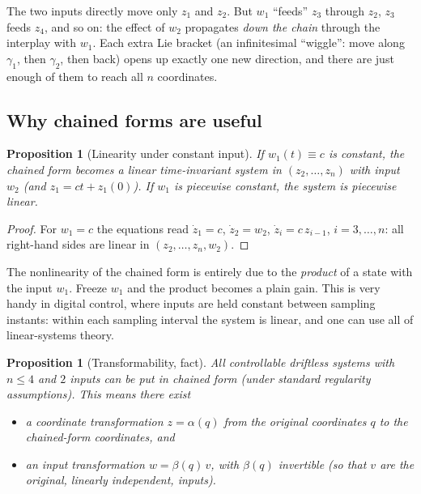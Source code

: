 \documentclass[11pt,a4paper]{article}
\def\bm#1{#1}%
\newcommand{\qv}{\bm{q}}
\newcommand{\zv}{\bm{z}}
\newcommand{\wv}{\bm{w}}
\newcommand{\vv}{\bm{v}}
\theoremstyle{definition}
\theoremstyle{plain}
\newtheorem{proposition}[definition]{Proposition}
\theoremstyle{remark}
\begin{document}
\begin{intuition}
The two inputs directly move only $z_1$ and $z_2$. But $w_1$ ``feeds'' $z_3$ through $z_2$, $z_3$ feeds $z_4$, and so on: the effect of $w_2$ propagates \emph{down the chain} through the interplay with $w_1$. Each extra Lie bracket (an infinitesimal ``wiggle'': move along $\bm\gamma_1$, then $\bm\gamma_2$, then back) opens up exactly one new direction, and there are just enough of them to reach all $n$ coordinates.
\end{intuition}

\subsection{Why chained forms are useful}

\begin{proposition}[Linearity under constant input]\label{prop:linear}
If $w_1(t)\equiv c$ is constant, the chained form becomes a \emph{linear} time-invariant system in $(z_2,\dots,z_n)$ with input $w_2$ (and $z_1=ct+z_1(0)$). If $w_1$ is piecewise constant, the system is piecewise linear.
\end{proposition}
\begin{proof}
For $w_1=c$ the equations read $\dot z_1=c$, $\dot z_2=w_2$, $\dot z_i=c\,z_{i-1}$, $i=3,\dots,n$: all right-hand sides are linear in $(z_2,\dots,z_n,w_2)$.
\end{proof}

\begin{intuition}
The nonlinearity of the chained form is entirely due to the \emph{product} of a state with the input $w_1$. Freeze $w_1$ and the product becomes a plain gain. This is very handy in digital control, where inputs are held constant between sampling instants: within each sampling interval the system is linear, and one can use all of linear-systems theory.
\end{intuition}

\begin{proposition}[Transformability, fact]\label{prop:transform}
All controllable driftless systems with $n\le 4$ and $2$ inputs can be put in chained form (under standard regularity assumptions). This means there exist
\begin{itemize}[nosep]
  \item a \emph{coordinate transformation} $\zv=\bm\alpha(\qv)$ from the original coordinates $\qv$ to the chained-form coordinates, and
  \item an \emph{input transformation} $\wv=\bm\beta(\qv)\,\vv$, with $\bm\beta(\qv)$ invertible (so that $\vv$ are the original, linearly independent, inputs).
\end{itemize}
\end{proposition}
\end{document}
